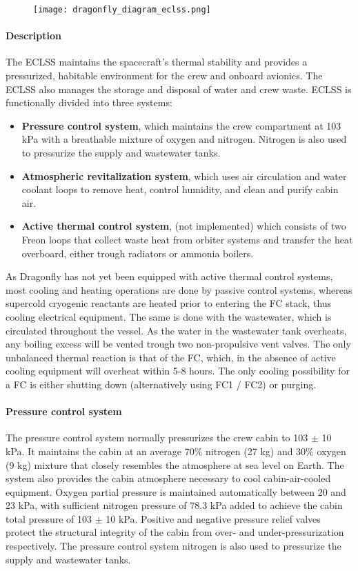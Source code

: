 \documentclass[Orbiter User Manual.tex]{subfiles}
\begin{document}
\begin{figure}[H]
  \centering
  \texttt{[image: dragonfly\_diagram\_eclss.png]}
\end{figure}

\paragraph{Description}
The ECLSS maintains the spacecraft's thermal stability and provides a pressurized, habitable environment for the crew and onboard avionics. The ECLSS also manages the storage and disposal of water and crew waste. ECLSS is functionally divided into three systems:

\begin{itemize}
\item \textbf{Pressure control system}, which maintains the crew compartment at 103 kPa with a breathable mixture of oxygen and nitrogen. Nitrogen is also used to pressurize the supply and wastewater tanks.
\item \textbf{Atmospheric revitalization system}, which uses air circulation and water coolant loops to remove heat, control humidity, and clean and purify cabin air.
\item \textbf{Active thermal control system}, (not implemented) which consists of two Freon loops that collect waste heat from orbiter systems and transfer the heat overboard, either trough radiators or ammonia boilers.
\end{itemize}

\noindent
As Dragonfly has not yet been equipped with active thermal control systems, most cooling and heating operations are done by passive control systems, whereas supercold cryogenic reactants are heated prior to entering the FC stack, thus cooling electrical equipment. The same is done with the wastewater, which is circulated throughout the vessel. As the water in the wastewater tank overheats, any boiling excess will be vented trough two non-propulsive vent valves. The only unbalanced thermal reaction is that of the FC, which, in the absence of active cooling equipment will overheat within 5-8 hours. The only cooling possibility for a FC is either shutting down (alternatively using FC1 / FC2) or purging.

\paragraph{Pressure control system}
The pressure control system normally pressurizes the crew cabin to 103 $\pm$ 10 kPa. It maintains the cabin at an average 70\% nitrogen (27 kg) and 30\% oxygen (9 kg) mixture that closely resembles the atmosphere at sea level on Earth. The system also provides the cabin atmosphere necessary to cool cabin-air-cooled equipment. Oxygen partial pressure is maintained automatically between 20 and 23 kPa, with sufficient nitrogen pressure of 78.3 kPa added to achieve the cabin total pressure of 103 $\pm$ 10 kPa. Positive and negative pressure relief valves protect the structural integrity of the cabin from over- and under-pressurization respectively. The pressure control system nitrogen is also used to pressurize the supply and wastewater tanks.
\end{document}
